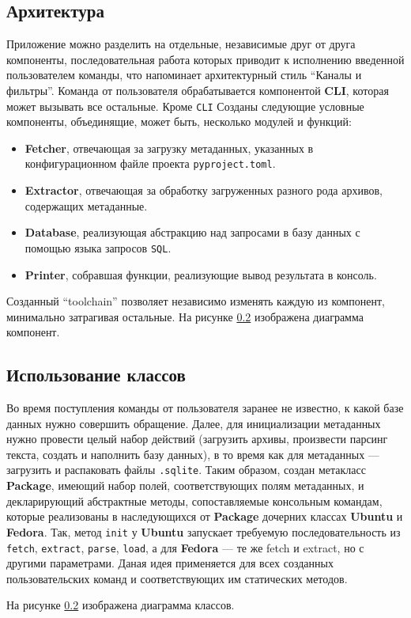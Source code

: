 \subsection{Архитектура}
Приложение можно разделить на отдельные, независимые друг от друга компоненты, последовательная работа которых приводит к исполнению введенной пользователем команды, что напоминает архитектурный стиль \enquote{Каналы и фильтры}.
Команда от пользователя обрабатывается компонентой \textbf{CLI}, которая может вызывать все остальные.
Кроме \texttt{CLI} Созданы следующие условные компоненты, объединящие, может быть, несколько модулей и функций:
\begin{itemize}
	\item \textbf{Fetcher}, отвечающая за загрузку метаданных, указанных в конфигурационном файле проекта \texttt{pyproject.toml}.
	\item \textbf{Extractor}, отвечающая за обработку загруженных разного рода архивов, содержащих метаданные.
	\item \textbf{Database}, реализующая абстракцию над запросами в базу данных с помощью языка запросов \texttt{SQL}.
	\item \textbf{Printer}, собравшая функции, реализующие вывод результата в консоль.
\end{itemize}

Созданный \enquote{toolchain} позволяет независимо изменять каждую из компонент, минимально затрагивая остальные.
На рисунке \ref{} изображена диаграмма компонент.

\subsection{Использование классов}
Во время поступления команды от пользователя заранее не известно, к какой базе данных нужно совершить обращение. Далее, для инициализации метаданных {\ubuntu} нужно провести целый набор действий (загрузить архивы, произвести парсинг текста, создать и наполнить базу данных), в то время как для метаданных {\fedora} --- загрузить и распаковать файлы \texttt{.sqlite}.
Таким образом, создан метакласс \textbf{Package}, имеющий набор полей, соответствующих полям метаданных, и декларирующий абстрактные методы, сопоставляемые консольным командам, которые реализованы в наследующихся от \textbf{Package} дочерних классах \textbf{Ubuntu} и \textbf{Fedora}.
Так, метод \texttt{init} у \textbf{Ubuntu} запускает требуемую последовательность из \texttt{fetch}, \texttt{extract}, \texttt{parse}, \texttt{load}, а для \textbf{Fedora} --- те же fetch и extract, но с другими параметрами.
Даная идея применяется для всех созданных пользовательских команд и соответствующих им статических методов.

На рисунке \ref{} изображена диаграмма классов.

